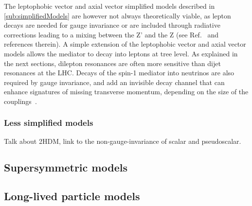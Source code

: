 The leptophobic vector and axial vector simplified models described in \ref{sub:simplifiedModels} 
are however not always theoretically viable, as lepton decays are needed for gauge invariance
or are included through radiative corrections leading to a mixing between the Z' and the Z 
(see Ref.~\cite{Albert:2017onk} and references therein). A simple extension of the leptophobic vector
and axial vector models allows the mediator to decay into leptons at tree level. 
As explained in the next sections, dilepton resonances are often more sensitive than dijet resonances
at the LHC. Decays of the spin-1 mediator into neutrinos are also required by gauge invariance, and add 
an invisible decay channel that can enhance signatures of missing transverse momentum, depending on
the size of the couplings~\cite{Albert:2017onk}. 







\subsubsection{Less simplified models}
\label{sec:LessSimplifiedModels}

Talk about 2HDM, link to the non-gauge-invariance of scalar and pseudoscalar. 

\subsection{Supersymmetric models}
\label{sec:SUSYModels}

\subsection{Long-lived particle models}
\label{sec:LLPModels}